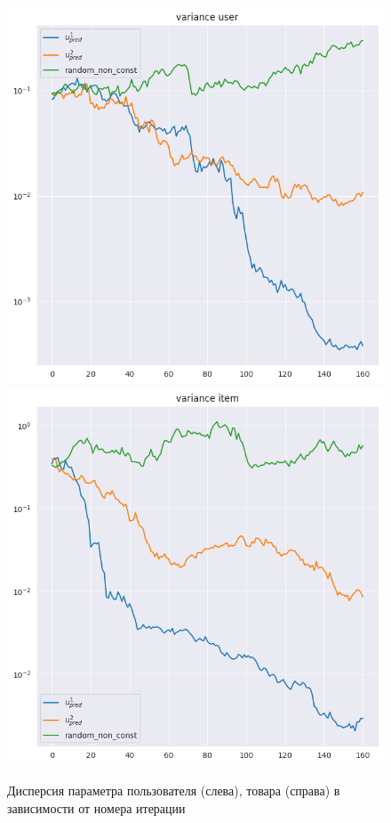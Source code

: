 \documentclass{article}
\begin{document}
\begin{figure}[h!]
    \centering
    \includegraphics[width=0.35\linewidth]{images/21_05_exp_uni/customer_variance.png}
    \includegraphics[width=0.35\linewidth]{images/21_05_exp_uni/item_variance.png}
    
    \caption{Дисперсия параметра пользователя (слева), товара (справа) в зависимости от номера итерации}
    \label{variances}
\end{figure}
\end{document}
